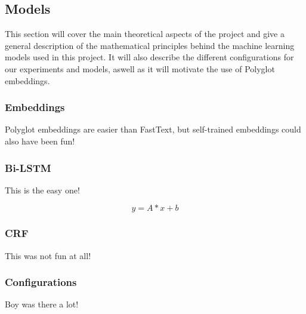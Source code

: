 
\subsection{Models}

This section will cover the main theoretical aspects of the project and give a
general description of the mathematical principles behind the machine learning
models used in this project. It will also describe the different configurations
for our experiments and models, aswell as it will motivate the use of Polyglot
embeddings.


\subsubsection{Embeddings}

Polyglot embeddings are easier than FastText, but self-trained embeddings could
also have been fun!


\subsubsection{Bi-LSTM}

This is the easy one!

\begin{equation}
y = A * x + b
\end{equation}


\subsubsection{CRF}

This was not fun at all!


\subsubsection{Configurations}

Boy was there a lot!


